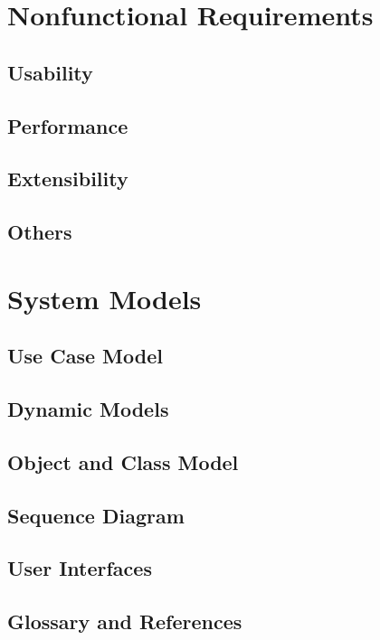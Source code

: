 \documentclass[a4paper,12pt]{report}
\begin{document}
	\chapter{Nonfunctional Requirements}
	\section{Usability}
	\section{Performance}
	\section{Extensibility}
	\section{Others}
	\chapter{System Models}
	\section{Use Case Model}
	\section{Dynamic Models}
	\section{Object and Class Model}
	\section{Sequence Diagram}
	\section{User Interfaces}
	\section{Glossary and References}
\end{document}
